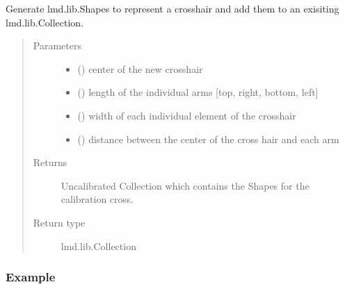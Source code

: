 \documentclass[a4paper,10pt,english,openany,oneside]{sphinxmanual}
\begin{document}
\begin{fulllineitems}
\label{\detokenize{pages/modules:lmd.tools.makeCross}}
\sphinxAtStartPar
Generate lmd.lib.Shapes to represent a crosshair and add them to an exisiting lmd.lib.Collection.
\begin{quote}\begin{description}
\item[{Parameters}] \leavevmode\begin{itemize}
\item {} 
\sphinxAtStartPar
{} () \textendash{} center of the new crosshair

\item {} 
\sphinxAtStartPar
{} () \textendash{} length of the individual arms {[}top, right, bottom, left{]}

\item {} 
\sphinxAtStartPar
{} () \textendash{} width of each individual element of the crosshair

\item {} 
\sphinxAtStartPar
{} () \textendash{} distance between the center of the cross hair and each arm

\end{itemize}

\item[{Returns}] \leavevmode
\sphinxAtStartPar
Uncalibrated Collection which contains the Shapes for the calibration cross.

\item[{Return type}] \leavevmode
\sphinxAtStartPar
lmd.lib.Collection

\end{description}\end{quote}
\subsubsection*{Example}

\begin{sphinxVerbatim}[commandchars=\\\{\}]
   
    
   


\end{sphinxVerbatim}
\end{fulllineitems}
\end{document}
